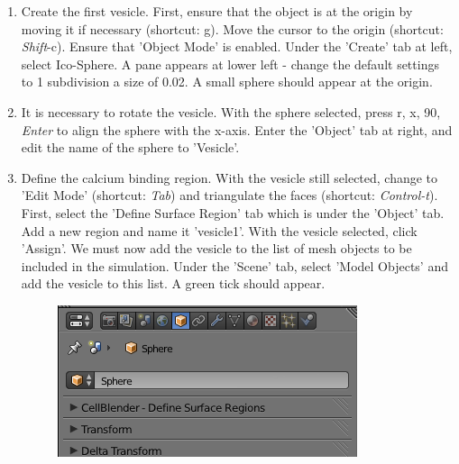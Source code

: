 \documentclass[twoside,a4paper]{refart}
\begin{document}
\begin{enumerate}
\item   Create the first vesicle. First, ensure that the object is at the origin by moving it if necessary (shortcut: g). Move the cursor to the origin (shortcut: \textit{Shift}-c). Ensure that 'Object Mode' is enabled. Under the 'Create' tab at left, select Ico-Sphere. A pane appears at lower left - change the default settings to 1 subdivision a size of 0.02. A small sphere should appear at the origin.

\item   It is necessary to rotate the vesicle. With the sphere selected, press r, x, 90, \textit{Enter} to align the sphere with the x-axis. Enter the 'Object' tab at right, and edit the name of the sphere to 'Vesicle'.

\item   Define the calcium binding region. With the vesicle still selected, change to 'Edit Mode' (shortcut: \textit{Tab}) and triangulate the faces (shortcut: \textit{Control-t}). First, select the 'Define Surface Region' tab which is under the 'Object' tab. Add a new region and name it 'vesicle1'. With the vesicle selected, click 'Assign'. We must now add the vesicle to the list of mesh objects to be included in the simulation. Under the 'Scene' tab, select 'Model Objects' and add the vesicle to this list. A green tick should appear.
        \begin{figure}[H]
        \includegraphics[scale=0.5]{vesicle1.png}
        \end{figure}


\end{enumerate}
\end{document}

